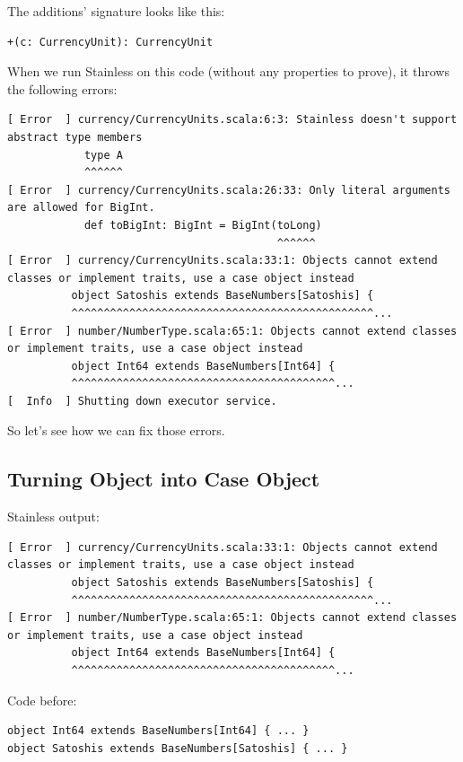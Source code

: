 \documentclass[runningheads]{llncs}
\begin{document}
The additions' signature looks like this:
\begin{lstlisting}[style=scala]
  +(c: CurrencyUnit): CurrencyUnit
\end{lstlisting}

When we run Stainless on this code (without any properties to prove), it throws the following errors:

\begin{lstlisting}[style=stainless]
[ Error  ] currency/CurrencyUnits.scala:6:3: Stainless doesn't support abstract type members
            type A
            ^^^^^^
[ Error  ] currency/CurrencyUnits.scala:26:33: Only literal arguments are allowed for BigInt.
            def toBigInt: BigInt = BigInt(toLong)
                                          ^^^^^^
[ Error  ] currency/CurrencyUnits.scala:33:1: Objects cannot extend classes or implement traits, use a case object instead
          object Satoshis extends BaseNumbers[Satoshis] {
          ^^^^^^^^^^^^^^^^^^^^^^^^^^^^^^^^^^^^^^^^^^^^^^^...
[ Error  ] number/NumberType.scala:65:1: Objects cannot extend classes or implement traits, use a case object instead
          object Int64 extends BaseNumbers[Int64] {
          ^^^^^^^^^^^^^^^^^^^^^^^^^^^^^^^^^^^^^^^^^...
[  Info  ] Shutting down executor service.
\end{lstlisting}

So let's see how we can fix those errors.


\subsection{Turning Object into Case Object}

Stainless output:
\begin{lstlisting}[style=stainless]
[ Error  ] currency/CurrencyUnits.scala:33:1: Objects cannot extend classes or implement traits, use a case object instead
          object Satoshis extends BaseNumbers[Satoshis] {
          ^^^^^^^^^^^^^^^^^^^^^^^^^^^^^^^^^^^^^^^^^^^^^^^...
[ Error  ] number/NumberType.scala:65:1: Objects cannot extend classes or implement traits, use a case object instead
          object Int64 extends BaseNumbers[Int64] {
          ^^^^^^^^^^^^^^^^^^^^^^^^^^^^^^^^^^^^^^^^^...
\end{lstlisting}

Code before:
\begin{lstlisting}[style=scala]
object Int64 extends BaseNumbers[Int64] { ... }
object Satoshis extends BaseNumbers[Satoshis] { ... }
\end{lstlisting}
\end{document}
